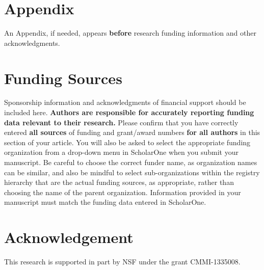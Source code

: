 \documentclass[journal]{new-aiaa}
\begin{document}
\section*{Appendix}

An Appendix, if needed, appears \textbf{before} research funding information and other acknowledgments.

\section*{Funding Sources}

Sponsorship information and acknowledgments of financial support should be included here. \textbf{Authors are responsible for accurately reporting funding data relevant to their research.} Please confirm that you have correctly entered \textbf{all sources} of funding and grant/award numbers \textbf{for all authors} in this section of your article. You will also be asked to select the appropriate funding organization from a drop-down menu in ScholarOne when you submit your manuscript. Be careful to choose the correct funder name, as organization names can be similar, and also be mindful to select sub-organizations within the registry hierarchy that are the actual funding sources, as appropriate, rather than choosing the name of the parent organization. Information provided in your manuscript must match the funding data entered in ScholarOne.

\section{Acknowledgement}
This research is supported in part by NSF under the grant CMMI-1335008.


\end{document}
